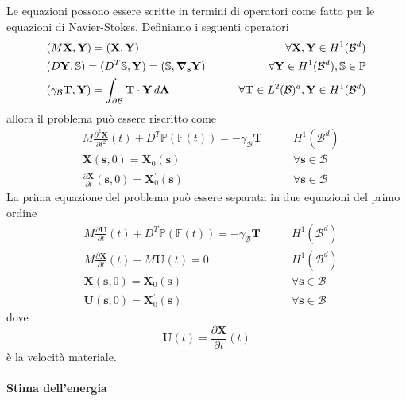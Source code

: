 Le equazioni possono essere scritte in termini di operatori come fatto per le equazioni di Navier-Stokes.
Definiamo i seguenti operatori
\begin{align*}
&\ps{M\mathbf{X}}{\mathbf{Y}}=\ps{\mathbf{X}}{\mathbf{Y}}\qquad&\forall\mathbf{X},\mathbf{Y}\in H^1(\mathcal{B}^d) \\
&\ps{D\mathbf{Y}}{\mathbb{S}}=\ps{D^T\mathbb{S}}{\mathbf{Y}}=\ps{\mathbb{S}}{\Nabla_{\mathbf{s}}\mathbf{Y}}\qquad&\forall\mathbf{Y}\in H^1(\mathcal{B}^d),\mathbb{S}\in\mathbb{P}\\
&\ps{\gamma_{\mathcal{B}}\mathbf{T}}{\mathbf{Y}}=\int_{\partial \mathcal{B}}\mathbf{T}\cdot\mathbf{Y}\,d\mathbf{A}\qquad&\forall\mathbf{T}\in L^2(\mathcal{B})^d,\mathbf{Y}\in H^1(\mathcal{B}^d) \\
\end{align*}
allora il problema può essere riscritto come
\begin{align*}
&M\frac{\partial^2 \mathbf{X}}{\partial t^2}(t)+D^T\mathbb{P}(\mathbb{F}(t))=-\gamma_{\mathcal{B}}\mathbf{T}
\qquad&H^1(\mathcal{B}^d) \\
&\mathbf{X}(\mathbf{s},0)=\mathbf{X}_0(\mathbf{s})\qquad&\forall\mathbf{s}\in\mathcal{B}\\
&\frac{\partial\mathbf{X}}{\partial t}(\mathbf{s},0)=\mathbf{X}^{'}_0(\mathbf{s})&\forall\mathbf{s}\in\mathcal{B}
\end{align*}
La prima equazione del problema può essere separata in due equazioni del primo ordine
\begin{align*}
&M\frac{\partial \mathbf{U}}{\partial t}(t)+D^T\mathbb{P}(\mathbb{F}(t))=-\gamma_{\mathcal{B}}\mathbf{T}
\qquad&H^1(\mathcal{B}^d) \\
&M\frac{\partial \mathbf{X}}{\partial t}(t)-M\mathbf{U}(t)=0
\qquad&H^1(\mathcal{B}^d) \\
&\mathbf{X}(\mathbf{s},0)=\mathbf{X}_0(\mathbf{s})\qquad&\forall\mathbf{s}\in\mathcal{B}\\
&\mathbf{U}(\mathbf{s},0)=\mathbf{X}^{'}_0(\mathbf{s})&\forall\mathbf{s}\in\mathcal{B}
\end{align*}
dove
\begin{equation*}
\mathbf{U}(t) = \frac{\partial \mathbf{X}}{\partial t}(t)
\end{equation*}
è la velocità materiale.

\paragraph{Stima dell'energia}

